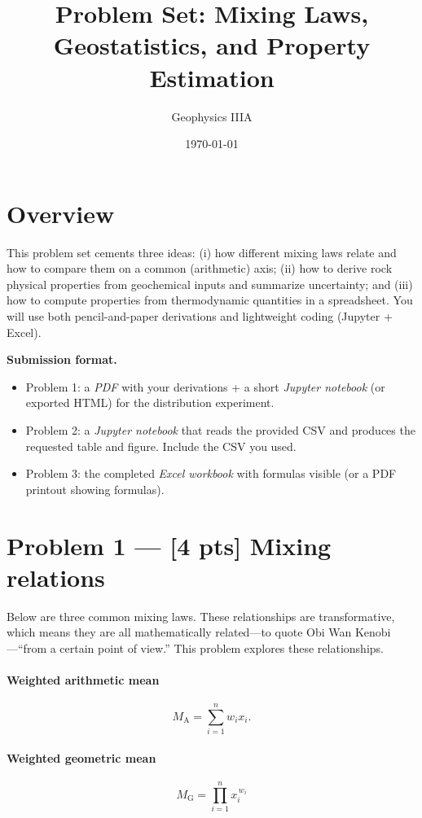 \documentclass[11pt,a4paper]{article}
\title{Problem Set: Mixing Laws, Geostatistics, and Property Estimation}
\author{Geophysics IIIA}
\date{\today}
\newcommand{\geom}{\mathrm{G}}
\newcommand{\arith}{\mathrm{A}}
\begin{document}
\maketitle

\section*{Overview}
This problem set cements three ideas: (i) how different mixing laws relate and how to compare them on a common (arithmetic) axis; (ii) how to derive rock physical properties from geochemical inputs and summarize uncertainty; and (iii) how to compute properties from thermodynamic quantities in a spreadsheet. You will use both pencil-and-paper derivations and lightweight coding (Jupyter + Excel).

\vspace{0.5em}
\noindent\textbf{Submission format.}
\begin{itemize}[leftmargin=*]
  \item Problem 1: a \emph{PDF} with your derivations + a short \emph{Jupyter notebook} (or exported HTML) for the distribution experiment.
  \item Problem 2: a \emph{Jupyter notebook} that reads the provided CSV and produces the requested table and figure. Include the CSV you used.
  \item Problem 3: the completed \emph{Excel workbook} with formulas visible (or a PDF printout showing formulas).
\end{itemize}

\section*{Problem 1 --- [4 pts] Mixing relations}
Below are three common mixing laws.  These relationships are transformative, which means they are all mathematically related---to quote Obi Wan Kenobi---``from a certain point of view.''  This problem explores these relationships.
\paragraph{Weighted arithmetic mean}
\[
    M_{\arith} = \sum_{i=1}^n w_i x_i.
\]

\paragraph{Weighted geometric mean}
\[
    M_{\geom} = \prod_{i=1}^n x_i^{\,w_i}
\]
\end{document}
